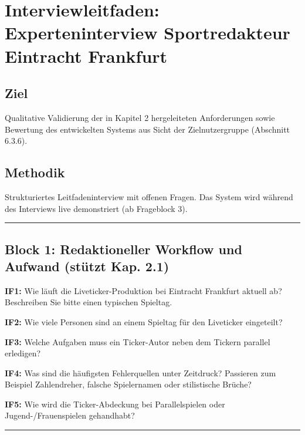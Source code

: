 \section{Interviewleitfaden: Experteninterview Sportredakteur Eintracht
Frankfurt}\label{interviewleitfaden-experteninterview-sportredakteur-eintracht-frankfurt}

\subsection{Ziel}\label{ziel}

Qualitative Validierung der in Kapitel 2 hergeleiteten Anforderungen
sowie Bewertung des entwickelten Systems aus Sicht der Zielnutzergruppe
(Abschnitt 6.3.6).

\subsection{Methodik}\label{methodik}

Strukturiertes Leitfadeninterview mit offenen Fragen. Das System wird
während des Interviews live demonstriert (ab Frageblock 3).

\begin{center}\rule{0.5\linewidth}{0.5pt}\end{center}

\subsection{Block 1: Redaktioneller Workflow und Aufwand (stützt Kap.
2.1)}\label{block-1-redaktioneller-workflow-und-aufwand-stuxfctzt-kap.-2.1}

\textbf{IF1:} Wie läuft die Liveticker-Produktion bei Eintracht
Frankfurt aktuell ab? Beschreiben Sie bitte einen typischen Spieltag.

\textbf{IF2:} Wie viele Personen sind an einem Spieltag für den
Liveticker eingeteilt?

\textbf{IF3:} Welche Aufgaben muss ein Ticker-Autor neben dem Tickern
parallel erledigen?

\textbf{IF4:} Was sind die häufigsten Fehlerquellen unter Zeitdruck?
Passieren zum Beispiel Zahlendreher, falsche Spielernamen oder
stilistische Brüche?

\textbf{IF5:} Wie wird die Ticker-Abdeckung bei Parallelspielen oder
Jugend-/Frauenspielen gehandhabt?

\begin{center}\rule{0.5\linewidth}{0.5pt}\end{center}

